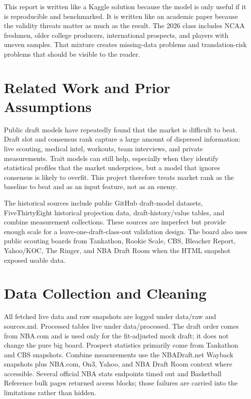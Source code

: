 \documentclass[11pt]{article}
\begin{document}
This report is written like a Kaggle solution because the model is only useful if it is reproducible and benchmarked. It is written like an academic paper because the validity threats matter as much as the result. The 2026 class includes NCAA freshmen, older college producers, international prospects, and players with uneven samples. That mixture creates missing-data problems and translation-risk problems that should be visible to the reader.

\section{Related Work and Prior Assumptions}

Public draft models have repeatedly found that the market is difficult to beat. Draft slot and consensus rank capture a large amount of dispersed information: live scouting, medical intel, workouts, team interviews, and private measurements. Trait models can still help, especially when they identify statistical profiles that the market underprices, but a model that ignores consensus is likely to overfit. This project therefore treats market rank as the baseline to beat and as an input feature, not as an enemy.

The historical sources include public GitHub draft-model datasets, FiveThirtyEight historical projection data, draft-history/value tables, and combine measurement collections. These sources are imperfect but provide enough scale for a leave-one-draft-class-out validation design. The board also uses public scouting boards from Tankathon, Rookie Scale, CBS, Bleacher Report, Yahoo/KOC, The Ringer, and NBA Draft Room when the HTML snapshot exposed usable data.

\section{Data Collection and Cleaning}

All fetched live data and raw snapshots are logged under data/raw and sources.md. Processed tables live under data/processed. The draft order comes from NBA.com and is used only for the fit-adjusted mock draft; it does not change the pure big board. Prospect statistics primarily come from Tankathon and CBS snapshots. Combine measurements use the NBADraft.net Wayback snapshots plus NBA.com, On3, Yahoo, and NBA Draft Room context where accessible. Several official NBA stats endpoints timed out and Basketball Reference bulk pages returned access blocks; those failures are carried into the limitations rather than hidden.
\end{document}
